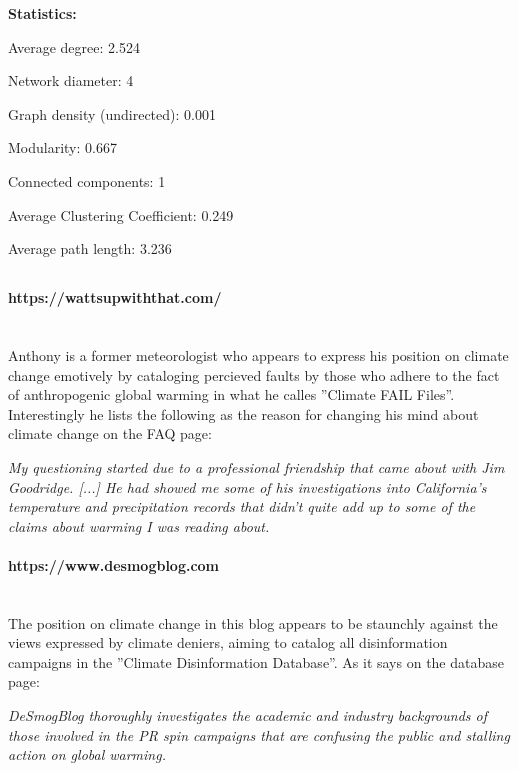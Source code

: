 \documentclass[11pt]{article}
\begin{document}
\textbf{}
\newline
\textbf{Statistics:} \hspace{0pt}

Average degree: \hfill 2.524

Network diameter: \hfill 4

Graph density (undirected): \hfill 0.001

Modularity: \hfill 0.667

Connected components: \hfill 1

Average Clustering Coefficient: \hfill 0.249

Average path length: \hfill 3.236

\subsection{}
\paragraph{https://wattsupwiththat.com/} \hspace{0pt} \\
Anthony is a former meteorologist who appears to express his position on climate
change emotively by cataloging percieved faults by those who adhere to the fact of
anthropogenic global warming in what he calles ''Climate FAIL Files''. Interestingly
he lists the following as the reason for changing his mind about climate change on
the FAQ page:

\begin{displayquote}
\textit{My questioning started due to a professional friendship that came
about with Jim Goodridge. [...] He had showed me some of his investigations into
California’s temperature and precipitation records that didn’t quite add up to some
of the claims about warming I was reading about.}
\end{displayquote}

\paragraph{https://www.desmogblog.com} \hspace{0pt} \\
The position on climate change in this blog appears to be staunchly against
the views expressed by climate deniers, aiming to catalog all disinformation
campaigns in the ''Climate Disinformation Database''. As it says on the
database page:

\begin{displayquote}
\textit{DeSmogBlog thoroughly investigates the academic and industry backgrounds of those
involved in the PR spin campaigns that are confusing the public and stalling action
on global warming.}
\end{displayquote}
\end{document}
